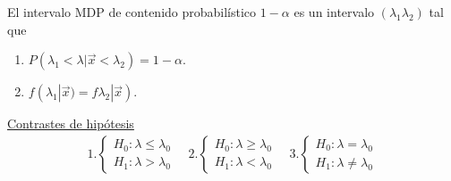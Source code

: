 \noindent El intervalo MDP de contenido probabilístico $1-\alpha$ es un intervalo $(\lambda_1\lambda_2)$ tal que
\begin{enumerate}
    \item $P(\lambda_1 < \lambda| \vec{x} < \lambda_2) = 1 - \alpha$.
    \item $f(\lambda_1 | \vec{x}) = f\lambda_2 | \vec{x})$.
\end{enumerate}
\noindent \underline{Contrastes de hipótesis}
\begin{align*}
   1. \begin{cases}
        H_0 : \lambda \leq \lambda_0 \\
        H_1 : \lambda > \lambda_0
    \end{cases} \quad     2.\begin{cases}
        H_0 : \lambda \ge \lambda_0 \\
        H_1 : \lambda < \lambda_0
    \end{cases} \quad     3.\begin{cases}
        H_0 : \lambda = \lambda_0 \\
        H_1 : \lambda \not = \lambda_0
    \end{cases}
\end{align*}


